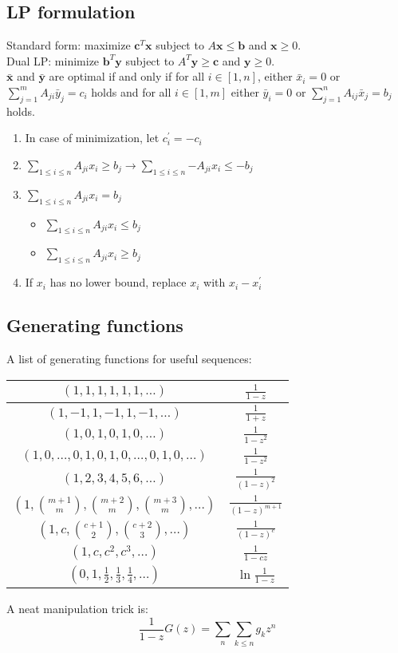 \subsection{LP formulation}
Standard form: maximize $\mathbf{c}^T\mathbf{x}$ subject to $A\mathbf{x} \leq \mathbf{b}$ and $\mathbf{x} \geq 0$. \\
Dual LP: minimize $\mathbf{b}^T\mathbf{y}$ subject to $A^T\mathbf{y} \geq \mathbf{c}$ and $\mathbf{y} \geq 0$. \\
$\bar{\mathbf{x}}$ and $\bar{\mathbf{y}}$ are optimal if and only if for all $i \in [1, n]$, either $\bar{x}_i = 0$ or $\sum_{j=1}^{m}A_{ji}\bar{y}_j = c_i$ holds and for all $i \in [1, m]$ either $\bar{y}_i = 0$ or $\sum_{j=1}^{n}A_{ij}\bar{x}_j = b_j$ holds.
\begin{enumerate}
    \itemsep-0.5em
    \item In case of minimization, let $c^\prime_i = -c_i$
    \item $\sum_{1 \leq i \leq n}{A_{ji}x_i} \geq b_j \rightarrow \sum_{1 \leq i \leq n}{-A_{ji}x_i} \leq -b_j$
    \item $\sum_{1 \leq i \leq n}{A_{ji}x_i} = b_j$ 
        \vspace{-0.5em}
        \begin{itemize}
            \itemsep-0.5em
            \item $\sum_{1 \leq i \leq n}{A_{ji}x_i} \leq b_j$
            \item $\sum_{1 \leq i \leq n}{A_{ji}x_i} \geq b_j$
        \end{itemize}
    \item If $x_i$ has no lower bound, replace $x_i$ with $x_i - x_i^\prime$
\end{enumerate}

\subsection{Generating functions}
  A list of generating functions for useful sequences:


  \begin{tabular}{|c|c|}
    \hline
    $(1,1,1,1,1,1,\ldots)$ & $\frac{1}{1-z}$ \\ \hline
    $(1,-1,1,-1,1,-1,\ldots)$ & $\frac{1}{1+z}$ \\ \hline
    $(1,0,1,0,1,0,\ldots)$ & $\frac{1}{1-z^2}$ \\ \hline
    $(1,0,\ldots,0,1,0,1,0,\ldots,0,1,0,\ldots)$ & $\frac{1}{1-z^2}$ \\ \hline
    $(1,2,3,4,5,6,\ldots)$ & $\frac{1}{(1-z)^2}$ \\ \hline
    $(1,\binom{m+1}{m},\binom{m+2}{m},\binom{m+3}{m},\ldots)$ & $\frac{1}{(1-z)^{m+1}}$ \\ \hline
    $(1,c,\binom{c+1}{2},\binom{c+2}{3},\ldots)$ & $\frac{1}{(1-z)^c}$ \\ \hline
    $(1,c,c^2, c^3, \ldots)$ & $\frac{1}{1-cz}$ \\ \hline
    $(0,1,\frac{1}{2},\frac{1}{3},\frac{1}{4},\ldots)$ & $\ln \frac{1}{1-z}$ \\ \hline
  \end{tabular}


A neat manipulation trick is:
\begin{equation*}
  \frac{1}{1-z}G(z) = \sum_{n}\sum_{k\leq n}g_kz^n
\end{equation*}


